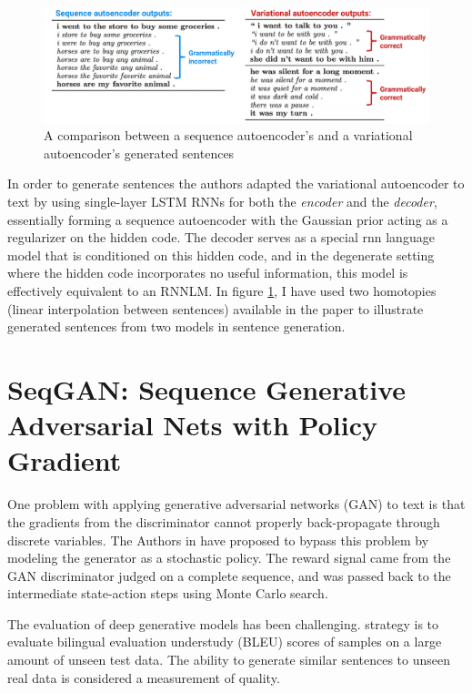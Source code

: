 \documentclass[letterpaper,12pt]{article}
\begin{document}
\begin{figure}
    \centering
    \includegraphics[width=\1\columnwidth]{literature_surveys2/seqAE-vs-VAE.png}
    \caption{A comparison between a sequence autoencoder's and a variational autoencoder's generated sentences}
    \label{fig:seqAE-vs-VAE}
\end{figure}

In order to generate sentences the authors adapted the variational autoencoder to text by using single-layer LSTM RNNs \cite{hochreiter1997a} for both the \textit{encoder} and the \textit{decoder}, essentially forming a sequence autoencoder with the Gaussian prior acting as a regularizer on the hidden code. The decoder serves as a special rnn language model that is conditioned on this hidden code, and in the degenerate setting where the hidden code incorporates no useful information, this model is effectively equivalent to an RNNLM. In figure \ref{fig:seqAE-vs-VAE}, I have used two homotopies (linear interpolation between sentences) available in the paper to illustrate generated sentences from two models in sentence generation.

\section{SeqGAN: Sequence Generative Adversarial Nets with Policy Gradient}
One problem with applying generative adversarial networks (GAN) to text is that the gradients from the discriminator cannot properly back-propagate through discrete variables. The Authors in \cite{Yu2016SeqGAN:Gradient} have proposed to bypass this problem by modeling the generator as a stochastic policy. The reward signal came from the GAN discriminator judged on a complete sequence, and was passed back to the intermediate state-action steps using Monte Carlo search.

The evaluation of deep generative models has been challenging. strategy is to evaluate bilingual evaluation understudy (BLEU) \cite{Papineni2002BLEU:Translation} scores of samples on a large amount of unseen test data. The ability to generate similar sentences to unseen real data is considered a measurement of quality.
\end{document}
